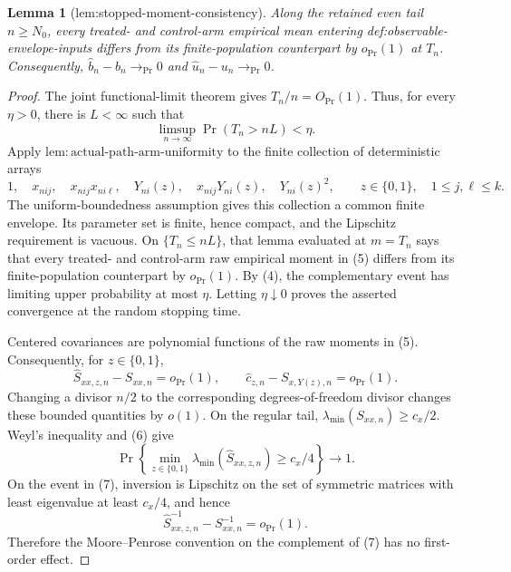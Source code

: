\documentclass{article}
\newtheorem{lemma}{Lemma}
\begin{document}
\begin{lemma}[lem:stopped-moment-consistency]\label{lem:stopped-moment-consistency}
Along the retained even tail \(n\ge N_0\), every treated- and control-arm empirical mean entering def:observable-envelope-inputs differs from its finite-population counterpart by \(o_{\Pr}(1)\) at \(T_n\). Consequently, \(\widehat b_n-b_n\to_{\Pr}0\) and \(\widehat u_n-u_n\to_{\Pr}0\).
\end{lemma}
\begin{proof}
The joint functional-limit theorem gives \(T_n/n=O_{\Pr}(1)\).  Thus, for every \(\eta>0\), there is \(L<\infty\) such that
\[
 \limsup_{n\to\infty}\Pr(T_n>nL)<\eta. \tag{4}
\]
Apply \(\mathrm{lem{:}actual\mbox{-}path\mbox{-}arm\mbox{-}uniformity}\) to the finite collection of deterministic arrays
\[
 1,\quad x_{nij},\quad x_{nij}x_{ni\ell},\quad
 Y_{ni}(z),\quad x_{nij}Y_{ni}(z),\quad Y_{ni}(z)^2,
 \qquad z\in\{0,1\},\quad 1\le j,\ell\le k. \tag{5}
\]
The uniform-boundedness assumption gives this collection a common finite envelope.  Its parameter set is finite, hence compact, and the Lipschitz requirement is vacuous.  On \(\{T_n\le nL\}\), that lemma evaluated at \(m=T_n\) says that every treated- and control-arm raw empirical moment in (5) differs from its finite-population counterpart by \(o_{\Pr}(1)\).  By (4), the complementary event has limiting upper probability at most \(\eta\).  Letting \(\eta\downarrow0\) proves the asserted convergence at the random stopping time.

Centered covariances are polynomial functions of the raw moments in (5).  Consequently, for \(z\in\{0,1\}\),
\[
 \widehat S_{xx,z,n}-S_{xx,n}=o_{\Pr}(1),
 \qquad
 \widehat c_{z,n}-S_{x,Y(z),n}=o_{\Pr}(1). \tag{6}
\]
Changing a divisor \(n/2\) to the corresponding degrees-of-freedom divisor changes these bounded quantities by \(o(1)\).  On the regular tail, \(\lambda_{\min}(S_{xx,n})\ge c_x/2\).  Weyl's inequality and (6) give
\[
 \Pr\!\left\{\min_{z\in\{0,1\}}
 \lambda_{\min}(\widehat S_{xx,z,n})\ge c_x/4\right\}\longrightarrow1. \tag{7}
\]
On the event in (7), inversion is Lipschitz on the set of symmetric matrices with least eigenvalue at least \(c_x/4\), and hence
\[
 \widehat S_{xx,z,n}^{-1}-S_{xx,n}^{-1}=o_{\Pr}(1).
\]
Therefore the Moore--Penrose convention on the complement of (7) has no first-order effect.


\end{proof}
\end{document}
